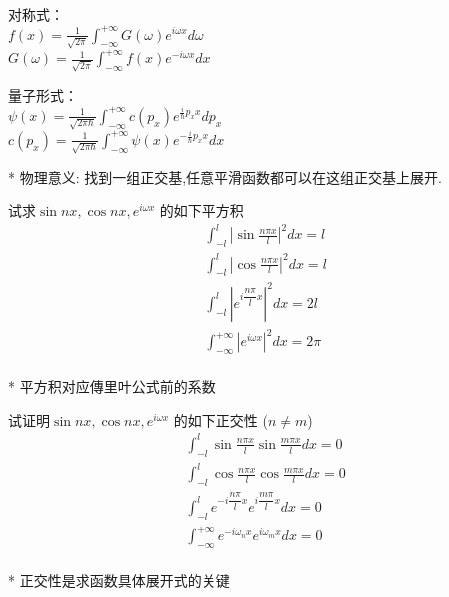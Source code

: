 \begin{frame}
      \frametitle{}
      对称式：\\ \vspace{0.3em}
      {$\displaystyle f(x) = \frac{1}{\sqrt{2\pi}}\int_{-\infty} ^{+\infty} G(\omega) e^{i \omega x} d \omega $}\\	
      {$\displaystyle G(\omega) = \frac{1}{\sqrt{2\pi}}\int_{-\infty} ^{+\infty} f(x) e^{-i \omega x} d x $  } \\ \vspace{0.6em}

      量子形式：\\ \vspace{0.3em}
      {$\displaystyle \psi(x) = \frac{1}{\sqrt{2\pi \hbar}}\int_{-\infty} ^{+\infty} c(p_x) e^{\frac{i}{\hbar} p_x x} d p_x $}\\	
      {$\displaystyle c(p_x) = \frac{1}{\sqrt{2\pi \hbar}}\int_{-\infty} ^{+\infty} \psi(x) e^{-\frac{i}{\hbar} p_x x} d x $  } \\
\end{frame}
\begin{frame}
    * 物理意义: 找到一组正交基,任意平滑函数都可以在这组正交基上展开. 
    \begin{exampleblock} {试求$\sin nx, \cos nx, e^{i\omega x}$ 的如下平方积}
    ~~\\
    \[ \begin{aligned}
            &\int_{-l} ^{l} \left| \sin \frac{n\pi x}{l} \right|^2 dx = l \\
            &\int_{-l} ^{l} \left| \cos \frac{n\pi x}{l} \right|^2 dx = l \\
            &\int_{-l} ^{l} \left| e^{i \dfrac{n\pi}{l} x} \right|^2  dx = 2l \\
            &\int_{-\infty} ^{+\infty} \left| e^{i \omega x} \right|^2  dx = 2\pi \\
    \end{aligned}\]
    \end{exampleblock}	
    * 平方积对应傳里叶公式前的系数
\end{frame}

\begin{frame}
    \begin{exampleblock} {试证明$\sin nx, \cos nx, e^{i\omega x}$ 的如下正交性 ($n \not = m $)}
    ~~\\
    \[ \begin{aligned}
            &\int_{-l} ^{l} \sin \frac{n\pi x}{l} \sin \frac{m\pi x}{l}  dx = 0 \\
            &\int_{-l} ^{l} \cos \frac{n\pi x}{l} \cos \frac{m\pi x}{l}  dx = 0 \\
            &\int_{-l} ^{l} e^{-i \dfrac{n\pi}{l} x} e^{i \dfrac{m\pi}{l} x}   dx = 0 \\
            &\int_{-\infty} ^{+\infty}  e^{-i \omega_n x} e^{i \omega_{m} x}   dx = 0 \\
    \end{aligned}\]
    \end{exampleblock}
    * 正交性是求函数具体展开式的关键	
\end{frame}

